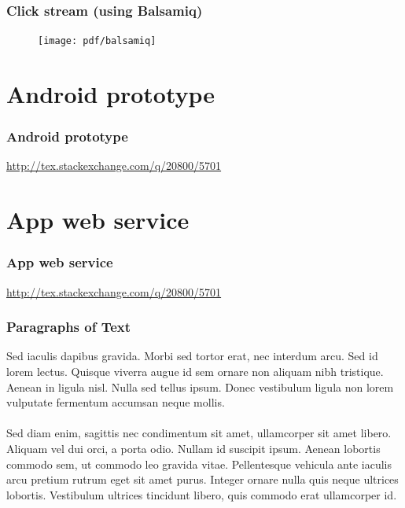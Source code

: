 \documentclass{beamer}
\begin{document}

\begin{frame}
\frametitle{Click stream (using Balsamiq)}
\begin{figure}
\texttt{[image: pdf/balsamiq]}
\end{figure}
\end{frame}


\section{Android prototype}


\begin{frame}
\frametitle{Android prototype}
\href{http://tex.stackexchange.com/q/20800/5701}{http://tex.stackexchange.com/q/20800/5701}
\end{frame}


\section{App web service}


\begin{frame}
\frametitle{App web service}
\href{http://tex.stackexchange.com/q/20800/5701}{http://tex.stackexchange.com/q/20800/5701}
\end{frame}


\begin{frame}
\frametitle{Paragraphs of Text}
Sed iaculis dapibus gravida. Morbi sed tortor erat, nec interdum arcu. Sed id lorem lectus. Quisque viverra augue id sem ornare non aliquam nibh tristique. Aenean in ligula nisl. Nulla sed tellus ipsum. Donec vestibulum ligula non lorem vulputate fermentum accumsan neque mollis.\\~\\

Sed diam enim, sagittis nec condimentum sit amet, ullamcorper sit amet libero. Aliquam vel dui orci, a porta odio. Nullam id suscipit ipsum. Aenean lobortis commodo sem, ut commodo leo gravida vitae. Pellentesque vehicula ante iaculis arcu pretium rutrum eget sit amet purus. Integer ornare nulla quis neque ultrices lobortis. Vestibulum ultrices tincidunt libero, quis commodo erat ullamcorper id.
\end{frame}
\end{document}
